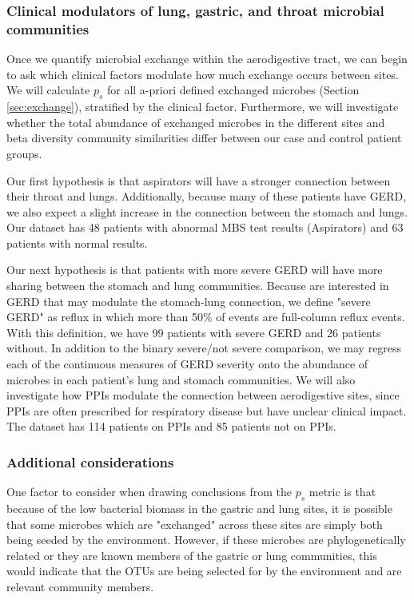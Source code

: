 \documentclass[12pt]{article}
\begin{document}
\subsubsection{Clinical modulators of lung, gastric, and throat microbial communities}
Once we quantify microbial exchange within the aerodigestive tract, we can begin to ask which clinical factors modulate how much exchange occurs between sites. We will calculate $p_s$ for all a-priori defined exchanged microbes (Section \ref{sec:exchange}), stratified by the clinical factor. Furthermore, we will investigate whether the total abundance of exchanged microbes in the different sites and beta diversity community similarities differ between our case and control patient groups.

Our first hypothesis is that aspirators will have a stronger connection between their throat and lungs. Additionally, because many of these patients have GERD, we also expect a slight increase in the connection between the stomach and lungs. Our dataset has 48 patients with abnormal MBS test results (Aspirators) and 63 patients with normal results.

Our next hypothesis is that patients with more severe GERD will have more sharing between the stomach and lung communities. Because are interested in GERD that may modulate the stomach-lung connection, we define "severe GERD" as reflux in which more than 50\% of events are full-column reflux events. With this definition, we have 99 patients with severe GERD and 26 patients without. In addition to the binary severe/not severe comparison, we may regress each of the continuous measures of GERD severity onto the abundance of microbes in each patient's lung and stomach communities. We will also investigate how PPIs modulate the connection between aerodigestive sites, since PPIs are often prescribed for respiratory disease but have unclear clinical impact. The dataset has 114 patients on PPIs and 85 patients not on PPIs.

\subsubsection{Additional considerations}
One factor to consider when drawing conclusions from the $p_s$ metric is that because of the low bacterial biomass in the gastric and lung sites, it is possible that some microbes which are "exchanged" across these sites are simply both being seeded by the environment. However, if these microbes are phylogenetically related or they are known members of the gastric or lung communities, this would indicate that the OTUs are being selected for by the environment and are relevant community members.
\end{document}

